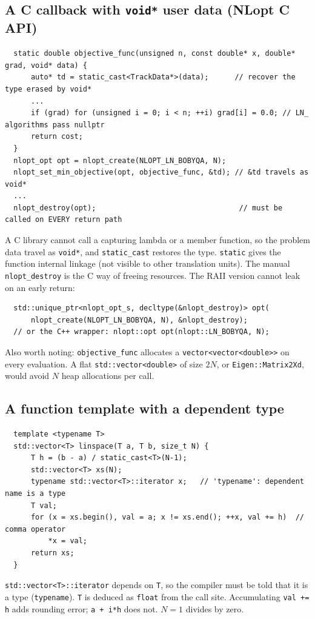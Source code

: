 \documentclass[10pt,a4paper]{scrartcl}
\newcommand{\code}[1]{\texttt{#1}}
\begin{document}
  \subsection{A C callback with \texttt{void*} user data (NLopt C API)}

  \begin{lstlisting}
  static double objective_func(unsigned n, const double* x, double* grad, void* data) {
      auto* td = static_cast<TrackData*>(data);      // recover the type erased by void*
      ...
      if (grad) for (unsigned i = 0; i < n; ++i) grad[i] = 0.0; // LN_ algorithms pass nullptr
      return cost;
  }
  nlopt_opt opt = nlopt_create(NLOPT_LN_BOBYQA, N);
  nlopt_set_min_objective(opt, objective_func, &td); // &td travels as void*
  ...
  nlopt_destroy(opt);                                 // must be called on EVERY return path
  \end{lstlisting}
  A C library cannot call a capturing lambda or a member function, so the problem data
  travel as \code{void*}, and \code{static\_cast} restores the type. \code{static}
  gives the function internal linkage (not visible to other translation units). The
  manual \code{nlopt\_destroy} is the C way of freeing resources. The RAII version
  cannot leak on an early return:
  \begin{lstlisting}
  std::unique_ptr<nlopt_opt_s, decltype(&nlopt_destroy)> opt(
      nlopt_create(NLOPT_LN_BOBYQA, N), &nlopt_destroy);
  // or the C++ wrapper: nlopt::opt opt(nlopt::LN_BOBYQA, N);
  \end{lstlisting}
  Also worth noting: \code{objective\_func} allocates a \code{vector<vector<double>>}
  on every evaluation. A flat \code{std::vector<double>} of size $2N$, or
  \code{Eigen::Matrix2Xd}, would avoid $N$ heap allocations per call.

  \subsection{A function template with a dependent type}

  \begin{lstlisting}
  template <typename T>
  std::vector<T> linspace(T a, T b, size_t N) {
      T h = (b - a) / static_cast<T>(N-1);
      std::vector<T> xs(N);
      typename std::vector<T>::iterator x;   // 'typename': dependent name is a type
      T val;
      for (x = xs.begin(), val = a; x != xs.end(); ++x, val += h)  // comma operator
          *x = val;
      return xs;
  }
  \end{lstlisting}
  \code{std::vector<T>::iterator} depends on \code{T}, so the compiler must be told that
  it is a type (\code{typename}). \code{T} is deduced as \code{float} from the call
  site. Accumulating \code{val += h} adds rounding error; \code{a + i*h} does not.
  $N=1$ divides by zero.
\end{document}
